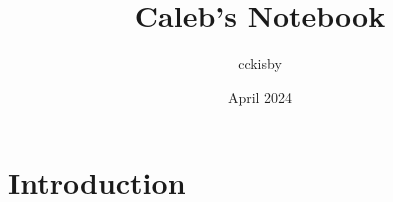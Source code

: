 \documentclass{article}
\title{Caleb's Notebook}
\author{cckisby }
\date{April 2024}
\begin{document}
\maketitle

\section{Introduction}
\end{document}
